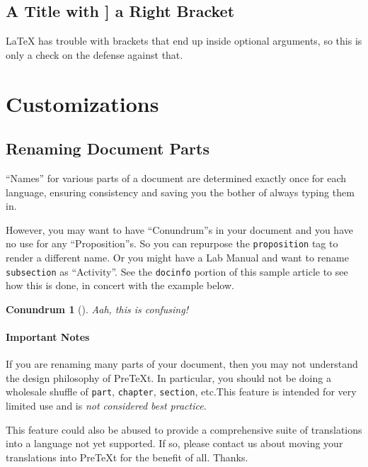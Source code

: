 \documentclass[10pt,]{article}
\theoremstyle{plain}
\newtheorem{proposition}[theorem]{Conundrum}
\theoremstyle{definition}
\theoremstyle{definition}
\theoremstyle{definition}
\theoremstyle{definition}
\theoremstyle{definition}
\theoremstyle{definition}
\numberwithin{equation}{section}
\begin{document}
\subsection[{A Title with ] a Right Bracket}]{A Title with ] a Right Bracket}\label{subsection-58}
\hypertarget{p-788}{}%
\LaTeX{} has trouble with brackets that end up inside optional arguments, so this is only a check on the defense against that.%
\typeout{************************************************}
\typeout{************************************************}
\section[{Customizations}]{Customizations}\label{section-25}
\typeout{************************************************}
\typeout{************************************************}
\subsection[{Renaming Document Parts}]{Renaming Document Parts}\label{rename-facility}
\hypertarget{p-789}{}%
``Names'' for various parts of a document are determined exactly once for each language, ensuring consistency and saving you the bother of always typing them in.%
\par
\hypertarget{p-790}{}%
However, you may want to have ``Conundrum''s in your document and you have no use for any ``Proposition''s.  So you can repurpose the \lstinline?proposition? tag to render a different name.  Or you might have a Lab Manual and want to rename \lstinline?subsection? as ``Activity''.  See the \lstinline?docinfo? portion of this sample article to see how this is done, in concert with the example below.%
\begin{proposition}[{}]\label{proposition-as-conundrum}
\hypertarget{p-791}{}%
Aah, this \emph{is} confusing!%
\end{proposition}
\typeout{************************************************}
\typeout{************************************************}
\paragraph[{Important Notes}]{Important Notes}\hypertarget{paragraphs-23}{}
\hypertarget{p-792}{}%
If you are renaming many parts of your document, then you may not understand the design philosophy of PreTeXt.  In particular, you should not be doing a wholesale shuffle of \lstinline?part?, \lstinline?chapter?, \lstinline?section?, etc.\@  This feature is intended for very limited use and is \emph{not considered best practice}.%
\par
\hypertarget{p-793}{}%
This feature could also be abused to provide a comprehensive suite of translations into a language not yet supported.  If so, please contact us about moving your translations into PreTeXt for the benefit of all.  Thanks.%
%
\appendix
%
\typeout{************************************************}
\typeout{************************************************}
\end{document}

